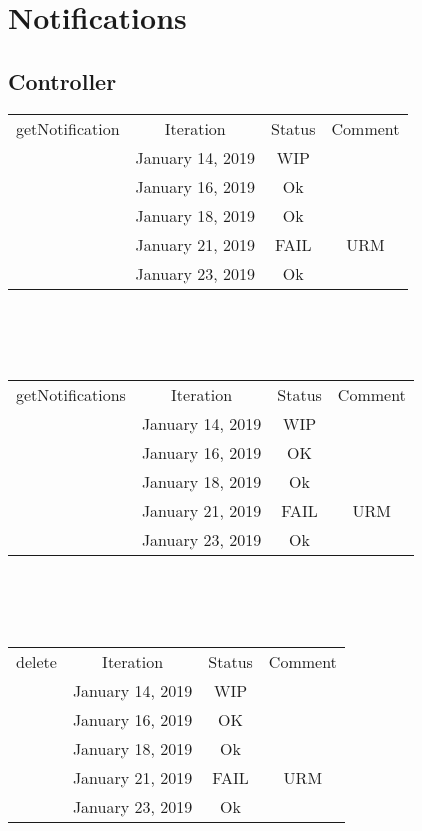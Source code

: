\documentclass{scrreprt}
\begin{document}
\section{Notifications}

\subsection{Controller}
	\begin{tabularx}{12cm}{X|c|c|c}
		getNotification & Iteration & Status & Comment  \\
		& January 14, 2019 & WIP & \\
		& January 16, 2019 & Ok & \\
		& January 18, 2019 & Ok & \\
		& January 21, 2019 & FAIL & URM \\
		& January 23, 2019 & Ok & \\
	\end{tabularx}	
	\\ \\ \\
	\begin{tabularx}{12cm}{X|c|c|c}
		getNotifications & Iteration & Status & Comment  \\
		& January 14, 2019 & WIP & \\
		& January 16, 2019 & OK & \\
		& January 18, 2019 & Ok & \\
		& January 21, 2019 & FAIL &  URM\\
		& January 23, 2019 & Ok & \\
	\end{tabularx}	
	\\ \\ \\
	\begin{tabularx}{12cm}{X|c|c|c}
		delete & Iteration & Status & Comment  \\
		& January 14, 2019 & WIP & \\
		& January 16, 2019 & OK & \\
		& January 18, 2019 & Ok & \\
		& January 21, 2019 & FAIL & URM \\
		& January 23, 2019 & Ok & \\
	\end{tabularx}	
\end{document}
